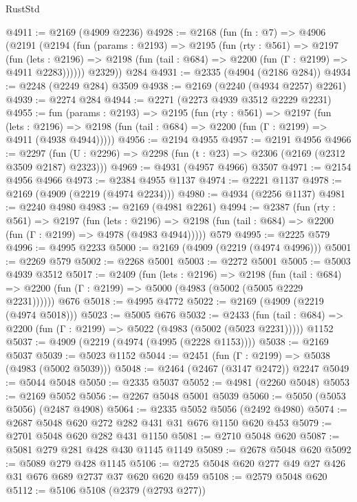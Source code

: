 \begin{lexlean}{RustStd}
\begin{coremodule}
{\begin{coremodule}
{{{{{{{{{{{{{{{@4911 := @2169 (@4909 @2236)
@4928 := @2168
    (fun (fn : @7) =>
    @4906
      (@2191
        (@2194
          (fun (params : @2193) =>
          @2195
            (fun (rty : @561) =>
            @2197
              (fun (lets : @2196) =>
              @2198 (fun (tail : @684) => @2200 (fun (Γ : @2199) => @4911 @2283))))))
        @2329))
    @284
@4931 := @2335 (@4904 (@2186 @284))
@4934 := @2248 (@2249 @284) @3509
@4938 := @2169 (@2240 (@4934 @2257) @2261)
@4939 := @2274 @284
@4944 := @2271 (@2273 @4939 @3512 @2229 @2231)
@4955 := fun (params : @2193) =>
  @2195
    (fun (rty : @561) =>
    @2197
      (fun (lets : @2196) =>
      @2198 (fun (tail : @684) => @2200 (fun (Γ : @2199) => @4911 (@4938 @4944)))))
@4956 := @2194 @4955
@4957 := @2191 @4956
@4966 := @2297 (fun (U : @2296) => @2298 (fun (t : @23) => @2306 (@2169 (@2312 @3509 @2187) @2323)))
@4969 := @4931 (@4957 @4966) @3507
@4971 := @2154 @4956 @4966
@4973 := @2384 @4955 @1137
@4974 := @2221 @1137
@4978 := @2169 (@4909 (@2219 (@4974 @2234)))
@4980 := @4934 (@2256 @1137)
@4981 := @2240 @4980
@4983 := @2169 (@4981 @2261)
@4994 := @2387
    (fun (rty : @561) =>
    @2197
      (fun (lets : @2196) =>
      @2198 (fun (tail : @684) => @2200 (fun (Γ : @2199) => @4978 (@4983 @4944)))))
    @579
@4995 := @2225 @579
@4996 := @4995 @2233
@5000 := @2169 (@4909 (@2219 (@4974 @4996)))
@5001 := @2269 @579
@5002 := @2268 @5001
@5003 := @2272 @5001
@5005 := @5003 @4939 @3512
@5017 := @2409
    (fun (lets : @2196) =>
    @2198
      (fun (tail : @684) => @2200 (fun (Γ : @2199) => @5000 (@4983 (@5002 (@5005 @2229 @2231))))))
    @676
@5018 := @4995 @4772
@5022 := @2169 (@4909 (@2219 (@4974 @5018)))
@5023 := @5005 @676
@5032 := @2433
    (fun (tail : @684) => @2200 (fun (Γ : @2199) => @5022 (@4983 (@5002 (@5023 @2231)))))
    @1152
@5037 := @4909 (@2219 (@4974 (@4995 (@2228 @1153))))
@5038 := @2169 @5037
@5039 := @5023 @1152
@5044 := @2451 (fun (Γ : @2199) => @5038 (@4983 (@5002 @5039)))
@5048 := @2464 (@2467 (@3147 @2472)) @2247
@5049 := @5044 @5048
@5050 := @2335 @5037
@5052 := @4981 (@2260 @5048)
@5053 := @2169 @5052
@5056 := @2267 @5048 @5001 @5039
@5060 := @5050 (@5053 @5056) (@2487 @4908)
@5064 := @2335 @5052 @5056 (@2492 @4980)
@5074 := @2687 @5048 @620 @272 @282 @431 @31 @676 @1150 @620 @453
@5079 := @2701 @5048 @620 @282 @431 @1150
@5081 := @2710 @5048 @620
@5087 := @5081 @279 @281 @428 @430 @1145 @1149
@5089 := @2678 @5048 @620
@5092 := @5089 @279 @428 @1145
@5106 := @2725 @5048 @620 @277 @49 @27 @426 @31 @676 @689 @2737 @37 @620 @620 @459
@5108 := @2579 @5048 @620
@5112 := @5106 @5108 (@2379 (@2793 @277))
}}}}}}}}}}}}}}}
\end{coremodule}}
\end{coremodule}
\end{lexlean}
